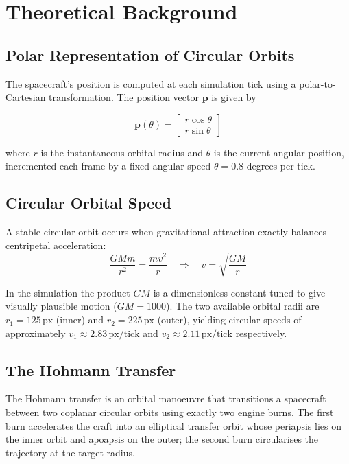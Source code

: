 \documentclass[12pt]{article}
\begin{document}
\section{Theoretical Background}

\subsection{Polar Representation of Circular Orbits}

The spacecraft's position is computed at each simulation tick using a polar-to-Cartesian transformation. The position vector $\mathbf{p}$ is given by

\begin{equation}
    \mathbf{p}(\theta) = \begin{bmatrix} r\cos\theta \\ r\sin\theta \end{bmatrix}
\end{equation}

where $r$ is the instantaneous orbital radius and $\theta$ is the current angular position, incremented each frame by a fixed angular speed $\dot\theta = 0.8$ degrees per tick.

\subsection{Circular Orbital Speed}

A stable circular orbit occurs when gravitational attraction exactly balances centripetal acceleration:
\begin{equation}
    \frac{GMm}{r^2} = \frac{mv^2}{r} \quad\Longrightarrow\quad v = \sqrt{\frac{GM}{r}}
\end{equation}

In the simulation the product $GM$ is a dimensionless constant tuned to give visually plausible motion ($GM = 1000$). The two available orbital radii are $r_1 = 125\,\text{px}$ (inner) and $r_2 = 225\,\text{px}$ (outer), yielding circular speeds of approximately $v_1 \approx 2.83\,\text{px/tick}$ and $v_2 \approx 2.11\,\text{px/tick}$ respectively.

\subsection{The Hohmann Transfer}

The Hohmann transfer is an orbital manoeuvre that transitions a spacecraft between two coplanar circular orbits using exactly two engine burns. The first burn accelerates the craft into an elliptical transfer orbit whose periapsis lies on the inner orbit and apoapsis on the outer; the second burn circularises the trajectory at the target radius.
\end{document}
